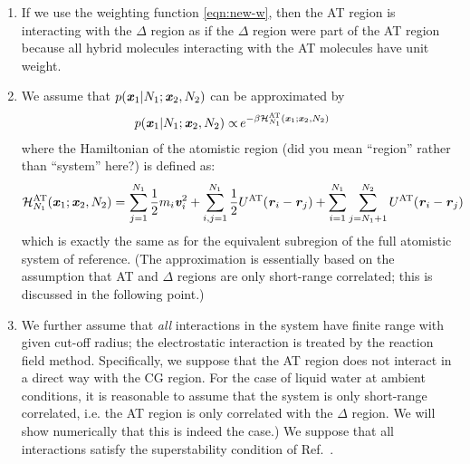 \documentclass[aip,jcp,a4paper,reprint,onecolumn]{revtex4-1}
\newcommand{\redc}[1]{{\color{red} #1}}
\newcommand{\bluec}[1]{{\color{blue} #1}}
\newcommand{\vect}[1]{\textbf{\textit{#1}}}
\newcommand{\AT}{{\textrm{{AT}}}}
\newcommand{\HY}{{\Delta}}
\begin{document}
\begin{enumerate}

\item If we use the weighting function \eqref{eqn:new-w},
then the AT region is interacting with the $\HY$ region
as if the $\HY$ region were part of the AT region because
all hybrid molecules interacting with the AT molecules have unit weight.

\item We assume that $p(\vect x_1 | N_1; \vect x_2, N_2)$  can be approximated by
\begin{align}\label{eqn:p-1-1}
  p(\vect x_1 | N_1; \vect x_2, N_2)
  \propto &\,
  e^{-\beta\mathcal H_{N_1}^{\AT}(\vect x_1; \vect x_2, N_2)}
\end{align}
\redc{where the Hamiltonian of the atomistic \bluec{region (did you mean ``region'' rather than ``system'' here?)} is defined as}:
\begin{align}\label{eqn:p-1-2}
  \mathcal H_{N_1}^{{\AT}}(\vect x_1; \vect x_2, N_2) = &\,
  \sum_{j=1}^{N_1}\frac12 m_i\vect v_i^2 + 
  \sum_{i,j=1}^{N_1}\frac12 U^{{\AT}}(\vect r_i - \vect r_j)  +
  \sum_{i=1}^{N_1}\sum_{j=N_1+1}^{N_2} U^{{\AT}}(\vect r_i - \vect r_j)   
\end{align}
which is exactly the same as for the equivalent subregion of the full atomistic system of reference. (The approximation is essentially based on the assumption that AT and $\Delta$ regions are only short-range correlated; this is discussed in the following point.)

\item We further assume that \emph{all} interactions in the system have finite range with given cut-off radius; the
  electrostatic interaction is treated by the reaction field method. Specifically, we suppose that 
  the AT region does not interact in a direct way with the CG region.
  For the case of liquid water at ambient conditions, it is reasonable to assume that the system is only short-range correlated, i.e. the AT region is only correlated with the $\HY$ region. We will show numerically that this is indeed the case.)
  We suppose that all interactions satisfy the superstability condition of Ref.~.
  

\end{enumerate}
\end{document}
